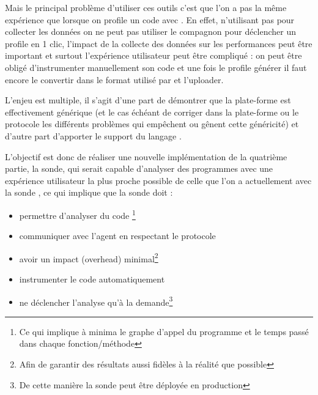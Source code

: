 Mais le principal problème d'utiliser ces outils c'est que l'on a pas la même expérience que lorsque on profile un code \PHP avec \Blackfire. En effet, n'utilisant pas \Blackfire pour collecter les données on ne peut pas utiliser le compagnon pour déclencher un profile en 1 clic, l'impact de la collecte des données sur les performances peut être important et surtout l'expérience utilisateur peut être compliqué : on peut être obligé d'instrumenter manuellement son code et une fois le profile générer il faut encore le convertir dans le format utilisé par \Blackfire et l'uploader.

L'enjeu est multiple, il s'agit d'une part de démontrer que la plate-forme \Blackfire est effectivement générique (et le cas échéant de corriger dans la plate-forme ou le protocole les différents problèmes qui empêchent ou gênent cette généricité) et d'autre part d'apporter le support du langage \Python.

L'objectif est donc de réaliser une nouvelle implémentation de la quatrième partie, la sonde, qui serait capable d'analyser des programmes \Python avec une expérience utilisateur la plus proche possible de celle que l'on a actuellement avec la sonde \PHP, ce qui implique que la sonde doit :
\begin{itemize}
  \item permettre d'analyser du code \Python\footnote{Ce qui implique à minima le graphe d'appel du programme et le temps passé dans chaque fonction/méthode}
  \item communiquer avec l'\gls{agent} en respectant le protocole
  \item avoir un impact (\gls{overhead}) minimal\footnote{Afin de garantir des résultats aussi fidèles à la réalité que possible}
  \item instrumenter le code automatiquement
  \item ne déclencher l'analyse qu'à la demande\footnote{De cette manière la sonde peut être déployée en production}
\end{itemize}

\setcounter{part}{0}
\setcounter{chapter}{0} 